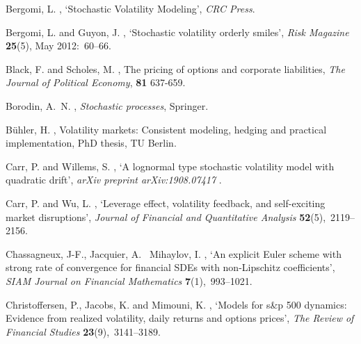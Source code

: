\documentclass[11pt,a4paper] {article}
\begin{document}
\begin{thebibliography}{}
Bergomi, L.  \harvardyearright , `Stochastic Volatility Modeling', {\em
  CRC Press}.

Bergomi, L. and Guyon, J.  \harvardyearright , `Stochastic volatility orderly smiles', {\em Risk Magazine}  {\bf 25}(5), May 2012:~60--66. 

Black, F. and Scholes, M.  \harvardyearright ,
  The pricing of options and corporate liabilities, {\em The Journal of Political Economy}, {\bf
  81} 637-659.

Borodin, A.~N.  \harvardyearright , {\em Stochastic
  processes}, Springer.


B{\"u}hler, H.  \harvardyearright , Volatility markets:
  Consistent modeling, hedging and practical implementation, PhD thesis, TU
  Berlin.


Carr, P. and Willems, S.  \harvardyearright , `A
  lognormal type stochastic volatility model with quadratic drift', {\em arXiv
  preprint arXiv:1908.07417} .

Carr, P. and Wu, L.  \harvardyearright ,
  `Leverage effect, volatility feedback, and self-exciting market disruptions',
  {\em Journal of Financial and Quantitative Analysis} {\bf 52}(5),~2119--2156.

Chassagneux, J-F., Jacquier, A. \harvardand\ Mihaylov, I.  \harvardyearright ,
  `An explicit Euler scheme with strong rate of convergence for financial SDEs with non-Lipschitz coefficients',
  {\em SIAM Journal on Financial Mathematics} {\bf 7}(1),~993--1021.

Christoffersen, P., Jacobs, K. and Mimouni, K.  \harvardyearright , `Models for s\&p 500 dynamics: Evidence from realized
  volatility, daily returns and options prices', {\em The Review of Financial
  Studies} {\bf 23}(9),~3141--3189.


\end{thebibliography}
\end{document}
